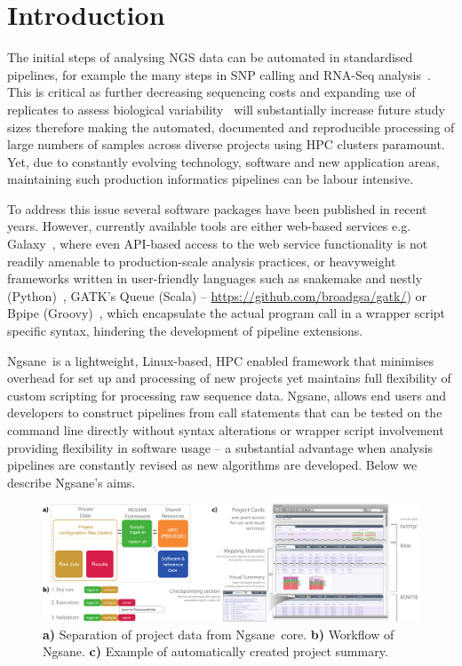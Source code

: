 \documentclass{bioinfo}
\newcommand{\prog}{{\sc Ngsane}}
\begin{document}
\section{Introduction}

The initial steps of analysing NGS data can be automated in standardised pipelines, for example the many steps in SNP calling and RNA-Seq analysis~\citep{Anders2013}.
This is critical as further decreasing sequencing costs and expanding use of replicates to assess biological variability~\citep{Auer2010} will substantially increase future study sizes therefore making the automated, documented and reproducible processing of large numbers of samples across diverse projects using HPC clusters paramount. 
Yet, due to constantly evolving technology, software and new application areas, maintaining such production informatics pipelines can be labour intensive. 

To address this issue several software packages have been published in recent years.
However, currently available tools are either web-based services e.g. Galaxy~\citep{Goecks2010}, where even API-based access to the web service functionality is not readily amenable to production-scale analysis practices, or heavyweight frameworks written in user-friendly languages such as {\sc snakemake} and {\sc nestly} (Python)~\citep{Koester2012,McCoy2013}, {\sc GATK}'s {\sc Queue} (Scala) -- \url{https://github.com/broadgsa/gatk/}) or {\sc Bpipe} (Groovy)~\citep{Sadedin2012},
 which encapsulate the actual program call in a wrapper script specific syntax, hindering the development of pipeline extensions. 

\prog\ is a lightweight, Linux-based, HPC enabled framework that minimises overhead for set up and processing of new projects yet maintains full flexibility of custom scripting for processing raw sequence data. 
\prog, allows end users and developers to construct pipelines from call statements that can be tested on the command line directly without syntax alterations or wrapper script involvement providing flexibility in software usage -- a substantial advantage when analysis pipelines are constantly revised as new algorithms are developed.    
 Below we describe \prog's aims.

\begin{figure}[tbh]
    \centering
   \includegraphics[type=pdf,ext=.pdf,read=.pdf, scale=0.18]{web_screens}
    \caption{
      {\bf a)} Separation of project data from \prog\ core. {\bf b)} Workflow of \prog . {\bf c)} Example of automatically created project summary.} 
      \label{fig:overview}
\end{figure}
\end{document}
